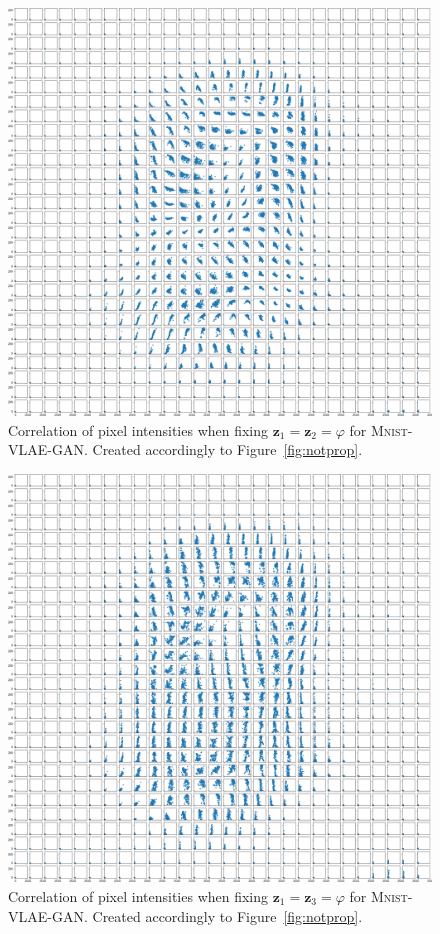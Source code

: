 \begin{figure}[H]
    \centering
    \includegraphics[width=\textwidth]{images/notprop/mnist/vlae_gan/ccs_0_1_vlae_gan.png}
    \caption[\textsc{Mnist}-VLAE-GAN Pixel - Correlation - $\bm{z}_1$ vs. $\bm{z}_3$]{Correlation of pixel intensities when fixing $\bm{z}_1 = \bm{z}_2=\varphi$ for \textsc{Mnist}-\ac{VLAE}-\ac{GAN}. Created accordingly to Figure~\ref{fig:notprop}.}
\end{figure}

\begin{figure}[H]
    \centering
    \includegraphics[width=\textwidth]{images/notprop/mnist/vlae_gan/ccs_0_2_vlae_gan.png}
    \caption[\textsc{Mnist}-VLAE-GAN - Pixel Correlation - $\bm{z}_1$ vs. $\bm{z}_3$]{Correlation of pixel intensities when fixing $\bm{z}_1 = \bm{z}_3=\varphi$ for \textsc{Mnist}-\ac{VLAE}-\ac{GAN}. Created accordingly to Figure~\ref{fig:notprop}.}
\end{figure}

